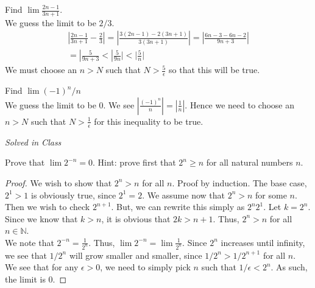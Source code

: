 \documentclass[12pt]{book}
\newcommand{\N}{\mathbb{N}}
\newenvironment{exercise}[2][Exercise]{\begin{trivlist}
\item[\hskip \labelsep {\bfseries #1}\hskip \labelsep {\bfseries #2.}]}{\end{trivlist}}
\begin{document}
\begin{exercise}{2.1.5}
Find $\lim  \frac{2n-1}{3n+1}$. \\

We guess the limit to be $2/3$. 
	\begin{align*}
	|\frac{2n-1}{3n+1} - \frac{2}{3}| = | \frac{3(2n-1) - 2(3n+1)}{3(3n+1)}| = | \frac{6n-3-6n-2}{9n+3} |\\
	= |\frac{5}{9n+3} < | \frac{5}{9n} | < | \frac{5}{n} |
	\end{align*}
We must choose an $n > N$ such that $N> \frac{5}{\epsilon}$ so that this will be true.
\end{exercise}


\begin{exercise}{2.1.6}
Find $\lim (-1)^n /n$ \\

We guess the limit to be $0$. We see $| \frac{(-1)^n}{n}| = |\frac{1}{n}|$. Hence we need to choose an $n>N$ such that $N> \frac{1}{\epsilon}$ for this inequality to be true.
\end{exercise}

\begin{exercise}{2.1.9}
\emph{Solved in Class}
\end{exercise}


\begin{exercise}{2.1.10}
Prove that $\lim 2^{-n} = 0$. Hint: prove first that $2^n \geq n$ for all natural numbers $n$.\\

	\begin{proof} 
	We wish to show that $2^n > n$ for all $n$. Proof by induction. The base case, $2^1 > 1$ is obviously true, since $2^1 = 2$. We assume now that $2^n > n$ for some $n$. Then we wish to check $2^{n+1}$. But, we can rewrite this simply as $2^n 2^1$. Let $k= 2^n$. Since we know that $k > n$, it is obvious that $2 k > n+1$. Thus, $2^n > n$ for all $n \in \N$. \\
	We note that $2^{-n} = \frac{1}{2^n}$. Thus, $\lim 2^{-n}  = \lim \frac{1}{2^n}$. Since $2^n$ increases until infinity, we see that $1/2^{n}$ will grow smaller and smaller, since $1/2^{n} > 1/2^{n+1}$ for all $n$.\\
	We see that for any $\epsilon > 0$, we need to simply pick $n$ such that $1/\epsilon < 2^n$.  As such, the limit is 0.
	\end{proof}
\end{exercise}
\end{document}
